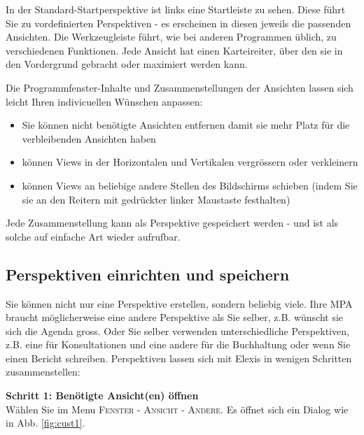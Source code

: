 In der Standard-Startperspektive ist links eine \glqq Startleiste\grqq{} zu
sehen. Diese führt Sie zu vordefinierten Perspektiven - es erscheinen in diesen
jeweils die passenden Ansichten. Die Werkzeugleiste führt, wie bei anderen
Programmen üblich, zu verschiedenen Funktionen. Jede Ansicht hat einen
Karteireiter, über den sie in den Vordergrund gebracht oder maximiert werden kann.
\par
{}
\medskip
Die Programmfenster-Inhalte und Zusammenstellungen der Ansichten lassen sich leicht Ihren indivicuellen Wünschen anpassen:\\

\begin{itemize}
  \item Sie können nicht benötigte Ansichten entfernen damit sie mehr Platz für
  die verbleibenden Ansichten haben
	\item können Views in der Horizontalen und Vertikalen vergrössern oder verkleinern
	\item können Views an beliebige andere Stellen des Bildschirms schieben (indem Sie sie
	an den Reitern mit gedrückter linker Maustaste \glqq festhalten\grqq{})
\end{itemize}

Jede Zusammenstellung kann als Perspektive gespeichert werden - und ist als
solche auf einfache Art wieder aufrufbar.

\subsection{Perspektiven einrichten und speichern}
Sie können nicht nur eine Perspektive erstellen, sondern beliebig viele. Ihre MPA braucht möglicherweise eine andere Perspektive als Sie selber, z.B. wünscht sie sich die Agenda gross. Oder Sie selber verwenden unterschiedliche Perspektiven, z.B. eine für Konsultationen und eine andere für die Buchhaltung oder wenn Sie einen Bericht schreiben. Perspektiven lassen sich mit Elexis in wenigen Schritten zusammenstellen:\\

\bigskip

\textbf{Schritt 1: Benötigte Ansicht(en) öffnen}\\

Wählen Sie im Menu \textsc{Fenster - Ansicht - Andere}. Es öffnet sich ein Dialog wie in Abb. \ref{fig:cust1}.\\

